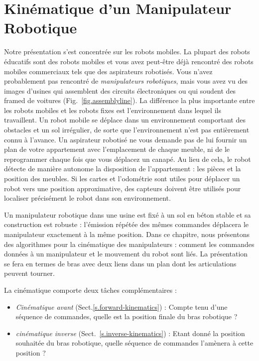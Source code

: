 
\chapter{Kinématique d'un Manipulateur Robotique}\label{ch.kinematics}

Notre présentation s'est concentrée sur les robots mobiles. La plupart des robots éducatifs sont des robots mobiles et vous avez peut-être déjà rencontré des robots mobiles commerciaux tels que des aspirateurs robotisés. Vous n'avez probablement pas rencontré de \emph{manipulateurs robotiques}, mais vous avez vu des images d'usines qui assemblent des circuits électroniques ou qui soudent des framed de voitures (Fig.~\ref{fig.assemblyline}). La différence la plus importante entre les robots mobiles et les robots fixes est l'environnement dans lequel ils travaillent. Un robot mobile se déplace dans un environnement comportant des obstacles et un sol irrégulier, de sorte que l'environnement n'est pas entièrement connu à l'avance. Un aspirateur robotisé ne vous demande pas de lui fournir un plan de votre appartement avec l'emplacement de chaque meuble, ni de le reprogrammer chaque fois que vous déplacez un canapé. Au lieu de cela, le robot détecte de manière autonome la disposition de l'appartement : les pièces et la position des meubles. Si les cartes et l'odométrie sont utiles pour déplacer un robot vers une position approximative, des capteurs doivent être utilisés pour localiser précisément le robot dans son environnement.

Un manipulateur robotique dans une usine est fixé à un sol en béton stable et sa construction est robuste : l'émission répétée des mêmes commandes déplacera le manipulateur exactement à la même position. Dans ce chapitre, nous présentons des algorithmes pour la cinématique des manipulateurs : comment les commandes données à un manipulateur et le mouvement du robot sont liés. La présentation se fera en termes de bras avec deux liens dans un plan dont les articulations peuvent tourner.

La cinématique comporte deux tâches complémentaires :
\begin{itemize}
\item \textit{Cinématique avant} (Sect.\ref{s.forward-kinematics}) : Compte tenu d'une séquence de commandes, quelle est la position finale du bras robotique ?
\item \textit{cinématique inverse} (Sect.~\ref{s.inverse-kinematics}) : Etant donné la position souhaitée du bras robotique, quelle séquence de commandes l'amènera à cette position ?
\end{itemize}


